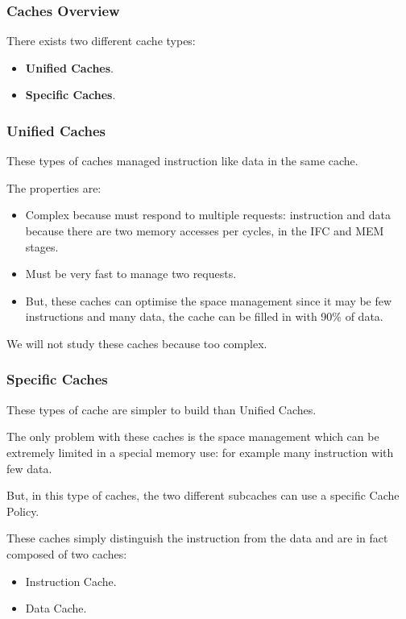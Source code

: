 
\begin{frame}
  \frametitle{Caches Overview}

  There exists two different cache types:

  \begin{itemize}
    \item
      \textbf{Unified Caches}.
    \item
      \textbf{Specific Caches}.
  \end{itemize}
\end{frame}


\begin{frame}
  \frametitle{Unified Caches}

  These types of caches managed instruction like data in the same cache.

  \-

  The properties are:

  \begin{itemize}
    \item
      Complex because must respond to multiple requests: instruction and data
      because there are two memory accesses per cycles, in the IFC and MEM
      stages.
    \item
      Must be very fast to manage two requests.
    \item
      But, these caches can optimise the space management since it may be
      few instructions and many data, the cache can be filled in with
      90\% of data.
  \end{itemize}

  We will not study these caches because too complex.
\end{frame}


\begin{frame}
  \frametitle{Specific Caches}

  These types of cache are simpler to build than Unified Caches.

  \-

  The only problem with these caches is the space management which
  can be extremely limited in a special memory use: for example many
  instruction with few data.

  \-

  But, in this type of caches, the two different subcaches can use
  a specific Cache Policy.

  \-

  These caches simply distinguish the instruction from the data and are
  in fact composed of two caches:

  \begin{itemize}
    \item
      Instruction Cache.
    \item
      Data Cache.
  \end{itemize}
\end{frame}

